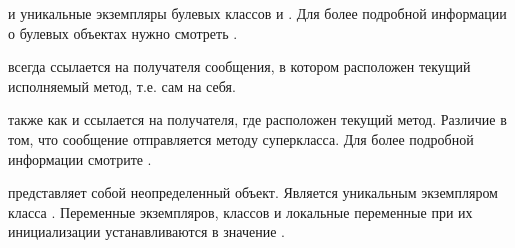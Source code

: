 \documentclass[a4paper,10pt,twoside]{book}
\begin{document}
 и  уникальные экземпляры булевых классов  и .
Для более подробной информации о булевых объектах нужно смотреть .


 всегда ссылается на получателя сообщения, в котором расположен текущий исполняемый метод, т.е. сам на себя.


 также как и  ссылается на получателя, где расположен текущий метод.
Различие в том, что сообщение отправляется методу суперкласса. Для более подробной информации смотрите .


 представляет собой неопределенный объект.
Является уникальным экземпляром класса .
Переменные экземпляров, классов и локальные переменные при их инициализации устанавливаются в значение .

\end{document}
